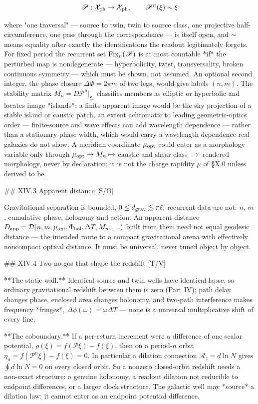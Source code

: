 $$\mathscr P:\mathcal X_{\rm ph}\to\mathcal X_{\rm ph},\qquad \mathscr P^n(\xi)\sim\xi$$

where "one traversal" — source to twin, twin to source class, one projective half-circumference, one pass through the correspondence — is itself open, and $\sim$ means equality after exactly the identifications the readout legitimately forgets. For fixed period the recurrent set ${\rm Fix}_n(\mathscr P)$ is at most countable *if* the perturbed map is nondegenerate — hyperbolicity, twist, transversality, broken continuous symmetry — which must be shown, not assumed. An optional second integer, the phase closure $\Delta\Phi = 2\pi m$ of two legs, would give labels $(n,m)$. The stability matrix $M_n = D\mathscr P^n|_{\xi_\ast}$ classifies members as elliptic or hyperbolic and locates image *islands*: a finite apparent image would be the sky projection of a stable island or caustic patch, an extent achromatic to leading geometric-optics order — finite-source and wave effects can add wavelength dependence — rather than a stationary-phase width, which would carry a wavelength dependence real galaxies do not show. A meridian coordinate $\mu_{\rm opt}$ could enter as a morphology variable only through $\mu_{\rm opt}\mapsto M_n\mapsto$ caustic and shear class $\mapsto$ rendered morphology, never by declaration; it is not the charge rapidity $\mu$ of §X.0 unless derived to be.

## XIV.3 Apparent distance [S/O]

Gravitational separation is bounded, $0\le d_{\rm grav}\lesssim\pi\ell$; recurrent data are not: $n$, $m$, cumulative phase, holonomy and action. An apparent distance $D_{\rm app} = \mathcal D(n,m,\mu_{\rm opt},\Phi_{\rm hol},\Delta T,M_n,\ldots)$ built from them need not equal geodesic distance — the intended route to a compact gravitational arena with effectively noncompact optical distance. It must be universal, never tuned object by object.

## XIV.4 Two no-gos that shape the redshift [T/V]

**The static wall.** Identical source and twin wells have identical lapse, so ordinary gravitational redshift between them is zero (Part IV); path delay changes phase, enclosed area changes holonomy, and two-path interference makes frequency *fringes*, $\Delta\phi(\omega) = \omega\Delta T$ — none is a universal multiplicative shift of every line.

**The coboundary.** If a per-return increment were a difference of one scalar potential, $\rho(\xi) = f(\mathscr P\xi)-f(\xi)$, then on a period-$n$ orbit $\eta_n = f(\mathscr P^n\xi)-f(\xi) = 0$. In particular a dilation connection $\mathcal A_z = d\ln N$ gives $\oint d\ln N = 0$ on every closed orbit. So a nonzero closed-orbit redshift needs a non-exact structure: a genuine holonomy, a readout dilation not reducible to endpoint differences, or a larger clock structure. The galactic well may *source* a dilation law; it cannot enter as an endpoint potential difference.

